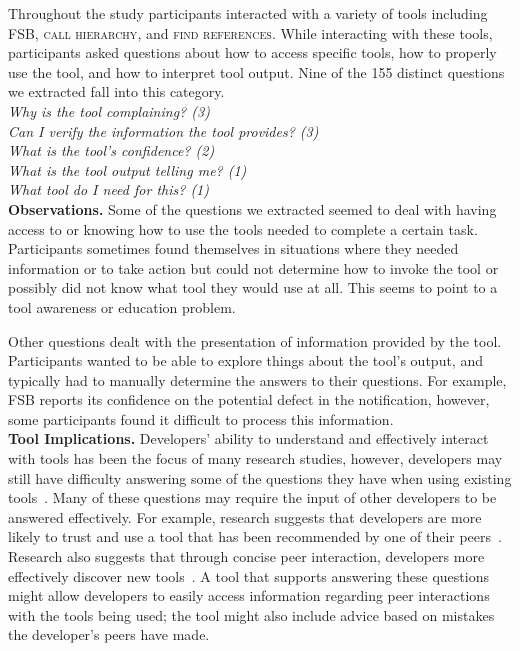 \documentclass[conference]{IEEEtran}
\begin{document}
Throughout the study participants interacted with a variety of tools including FSB, \textsc{call hierarchy}, and \textsc{find references}. 
While interacting with these tools, participants asked questions about how to access specific tools, how to properly use the tool, and how to interpret tool output. 
Nine of the 155 distinct questions we extracted fall into this category.
\\

\noindent\emph{Why is the tool complaining? (3)} \\
\emph{Can I verify the information the tool provides? (3)} \\
\emph{What is the tool's confidence? (2)} \\
\emph{What is the tool output telling me? (1)} \\
\emph{What tool do I need for this? (1)} \\


\noindent\textbf{Observations.}
Some of the questions we extracted seemed to deal with having access to or knowing how to use the tools needed to complete a certain task. 
Participants sometimes found themselves in situations where they needed information or to take action but could not determine how to invoke the tool or possibly did not know what tool they would use at all. 
This seems to point to a tool awareness or education problem.

Other questions dealt with the presentation of information provided by the tool. 
Participants wanted to be able to explore things about the tool's output, and typically had to manually determine the answers to their questions. 
For example, FSB reports its confidence on the potential defect in the notification, however, some participants found it difficult to process this information.
\\


\noindent\textbf{Tool Implications.}
Developers' ability to understand and effectively interact with tools has been the focus of many research studies, however, developers may still have difficulty answering some of the questions they have when using existing tools~\cite{ko2004designing, khoo2008path, johnson2013don}. 
Many of these questions may require the input of other developers to be answered effectively. 
For example, research suggests that developers are more likely to trust and use a tool that has been recommended by one of their peers~\cite{murphy2010trust}.
Research also suggests that through concise peer interaction, developers more effectively discover new tools~\cite{murphy2011peer}. 
A tool that supports answering these questions might allow developers to easily access information regarding peer interactions with the tools being used; the tool might also include advice based on mistakes the developer's peers have made. 
 
\end{document}
